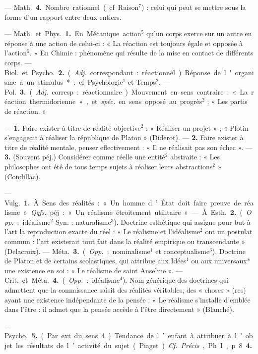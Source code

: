 \begin{itemize}[leftmargin=1cm, label=, itemsep=1pt]
— \si{Math.} {\bf 4.} Nombre rationnel (cf.
Raison$^7$) : celui qui peut se mettre
sous la forme d’un rapport entre
deux entiers.

 — \si{Math.} et \si{Phys.} {\bf 1.} En
Mécanique action$^5$ qu’un corps
exerce sur un autre en réponse à
une action de celui-ci : « La réaction
est toujours égale et opposée à
l'action$^5$. » En Chimie : phénomène
qui résulte de la mise en contact de
différents corps. — \si{Biol.} et \si{Psycho.}
 {\bf 2.} ({\it Adj.} correspondant : réactionnel).
Réponse de l'organisme à un stimulus* : cf. Psychologie$^1$ et Temps$^2$.
— \si{Pol.} {\bf 3.} ({\it Adj.} corresp. : réactionnaire). Mouvement en sens contraire : « La réaction thermidorienne », et {\it spéc.} en sens opposé au
progrès$^2$ : « Les partis de réaction. »

 — {\bf 1.} Faire exister à titre de
réalité objective$^2$ : « Réaliser un
projet » ; « Plotin s'engageait à réaliser la république de Platon » (Diderot). — {\bf 2.} Faire exister à titre de
réalité mentale, penser eflectivement : « Il ne réalisait pas son
échec ». — {\bf 3.} (Souvent péj.) Considérer comme réelle une entité$^2$ abstraite : « Les philosophes ont été
de tous temps sujets à réaliser leurs
abstractions$^2$ » (Condillac).

 — \si{Vulg.} {\bf 1.} À. Sens des réalités : « Un homme d’État doit faire
preuve de réalisme. » {\it Qqfs.} péj. :
« Un réalisme étroitement utilitaire. »

— À. \si{Esth.} {\bf 2.} ({\it Opp.} : idéalisme$^2$
Syn. : naturalisme$^3$). Doctrine esthétique qui assigne pour but à l’art
la reproduction exacte du réel : « Le
réalisme et l’idéalisme$^2$ ont un postulat
commun : l'art existerait tout
fait dans la réalité empirique ou
transcendante » (Delacroix). —
\si{Méta.} {\bf 3.} ({\it Opp.} : nominalisme$^1$ et
conceptualisme$^3$). Doctrine de Platon
et de certains scolastiques, qui
attribue aux Idées$^1$ ou aux universaux* une existence en soi : « Le
réalisme de saint Anselme ». —
\si{Crit.} et \si{Méta.} {\bf 4.} ({\it Opp.} : idéalisme$^4$).
Nom générique des doctrines qui
admettent que la connaissance saisit
des réalités véritables, des « choses »
(res) ayant une existence indépendante de la pensée : « Le réalisme
s’installe d'emblée dans l'être : il
admet que la pensée accède à l'être
directement » (Blanché).

— \si{Psycho.} {\bf 5.} (Par ext. du sens 4).
Tendance de l’enfant à attribuer à
l’objet les résultats de l’activité du
sujet (Piaget). {\it Cf.} {\it Précis}, Ph. I,
p. 8 {\bf 4.}


\end{itemize}
